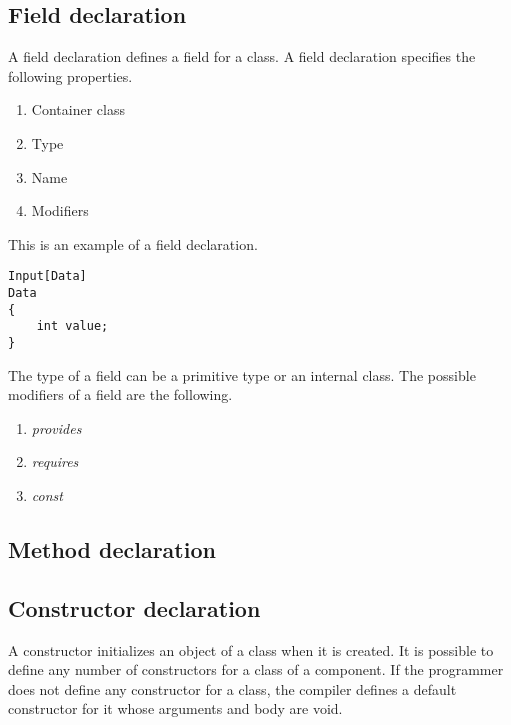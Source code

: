 \documentclass[acmsmall]{acmart}
\begin{document}
\subsection{Field declaration}
A field declaration defines a field for a class.
A field declaration specifies the following properties.
\begin{enumerate}
\item Container class
\item Type
\item Name
\item Modifiers
\end{enumerate}
This is an example of a field declaration.
\begin{lstlisting}
Input[Data]
Data
{
	int value;
}
\end{lstlisting}
The type of a field can be a primitive type or an internal class.
The possible modifiers of a field are the following.
\begin{enumerate}
\item\textit{provides}
\item\textit{requires}
\item\textit{const}
\end{enumerate}

\subsection{Method declaration}
\subsection{Constructor declaration}
A constructor initializes an object of a class when it is created.
It is possible to define any number of constructors for a class of a component.
If the programmer does not define any constructor for a class, the compiler defines a default constructor for it whose arguments and body are void.
\end{document}
